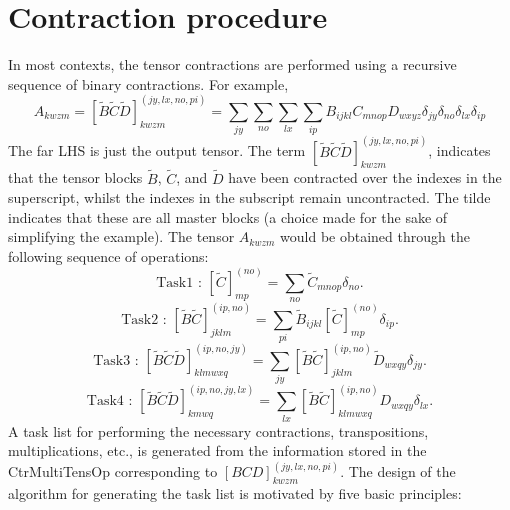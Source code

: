 \section{ Contraction procedure } 
\noindent In most contexts, the tensor contractions are performed using a recursive sequence of binary contractions. For example,
\begin{equation}
A_{kwzm} = 
[\tilde{B}\tilde{C}\tilde{D}]^{(jy,lx,no,pi)}_{kwzm} = \sum_{jy}\sum_{no}\sum_{lx}\sum_{ip} B_{ijkl}C_{mnop}D_{wxyz} \delta_{jy} \delta_{no} \delta_{lx}\delta_{ip}
\end{equation}
The far LHS is just the output tensor. 
The term $[\tilde{B}\tilde{C}\tilde{D}]^{(jy,lx,no,pi)}_{kwzm}$, indicates that the tensor blocks
$\tilde{B}$, $\tilde{C}$, and $\tilde{D}$ have been contracted over the indexes in the superscript, whilst
the indexes in the subscript remain uncontracted. The tilde indicates that these are
all master blocks (a choice made for the sake of simplifying the example). 
The tensor $A_{kwzm}$ would be obtained through the following sequence of operations:
\begin{equation}
\text{Task1 \ : \ \ }
[\tilde{C}]^{(no)}_{mp} = \sum_{no} \tilde{C}_{mnop}\delta_{no}.
\label{eqn:ctr_list_t1}
\end{equation}
\begin{equation}
\text{Task2 \ : \ \ }
[\tilde{B}\tilde{C}]^{(ip,no)}_{jklm} = \sum_{pi} \tilde{B}_{ijkl}[\tilde{C}]_{mp}^{(no)}\delta_{ip}.
\label{eqn:ctr_list_t2}
\end{equation}
\begin{equation}
\text{Task3 \ : \ \ }
[\tilde{B}\tilde{C}\tilde{D}]^{(ip,no,jy)}_{klmwxq} = \sum_{jy} [\tilde{B}\tilde{C}]^{(ip,no)}_{jklm}
 \tilde{D}_{wxqy}\delta_{jy}.
\label{eqn:ctr_list_t3}
\end{equation}
\begin{equation}
\text{Task4 \ : \ \ }
[\tilde{B}\tilde{C}\tilde{D}]^{(ip,no,jy,lx)}_{kmwq} = \sum_{lx} [\tilde{B}\tilde{C}]^{(ip,no)}_{klmwxq} D_{wxqy}\delta_{lx}.
\label{eqn:ctr_list_t4}
\end{equation}
A task list for performing the necessary contractions, transpositions, multiplications, etc.,
is generated from the information stored in the CtrMultiTensOp corresponding to $[BCD]^{(jy,lx,no,pi)}_{kwzm}$.
The design of the algorithm for generating the task list is motivated by five basic principles: 
